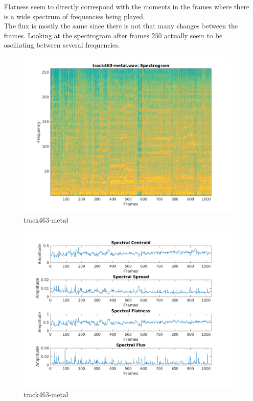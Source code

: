 \documentclass[11pt, a4paper]{article}
\begin{document}
Flatness seem to directly correspond with the moments in the frames where there is a wide spectrum of frequencies being played. \\

The flux is mostly the same since there is not that many changes between the frames. Looking at the spectrogram after frames 250 actually seem to be oscillating between several frequencies. 

\pagebreak

\begin{figure}[H]
    \centering
    \includegraphics[width=.75\textwidth]{track463-metal-specto.png}
    \caption{track463-metal}
\end{figure}
\begin{figure}[H]
    \centering
    \includegraphics[width=1\textwidth]{track463-metal-spectral.png}
    \caption{track463-metal}
\end{figure}
\end{document}

